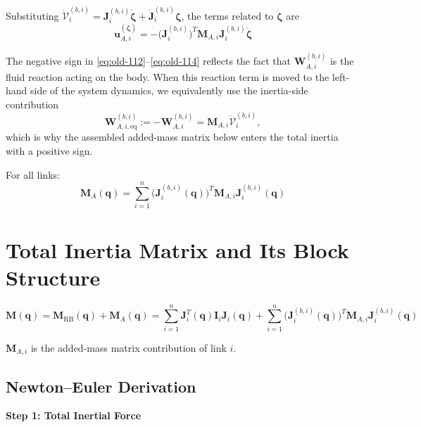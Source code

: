 \documentclass[12pt,a4paper]{report}
\newcommand{\newsymbols}[1]{\par\noindent{}#1\par\vspace{0.35em}}
\begin{document}
Substituting $\dot{\mathcal{V}}_i^{(b,i)} = \mathbf{J}_i^{(b,i)} \dot{\boldsymbol{\zeta}} + \dot{\mathbf{J}}_i^{(b,i)} \boldsymbol{\zeta}$, the terms related to $\dot{\boldsymbol{\zeta}}$ are
\begin{equation}
\mathbf{u}_{A,i}^{(\dot{\boldsymbol{\zeta}})} = -\bigl(\mathbf{J}_i^{(b,i)}\bigr)^T \mathbf{M}_{A,i} \mathbf{J}_i^{(b,i)} \dot{\boldsymbol{\zeta}}
\label{eq:old-114}
\end{equation}

The negative sign in \eqref{eq:old-112}--\eqref{eq:old-114} reflects the fact that $\mathbf{W}_{A,i}^{(b,i)}$ is the fluid reaction acting on the body. When this reaction term is moved to the left-hand side of the system dynamics, we equivalently use the inertia-side contribution
\begin{equation}
\mathbf{W}_{A,i,\mathrm{eq}}^{(b,i)}
:=
-\mathbf{W}_{A,i}^{(b,i)}
=
\mathbf{M}_{A,i}\dot{\mathcal{V}}_i^{(b,i)},
\end{equation}
which is why the assembled added-mass matrix below enters the total inertia with a positive sign.

For all links:
\begin{equation}
\boxed{\mathbf{M}_A(\mathbf{q}) = \sum_{i=1}^{n} \bigl(\mathbf{J}_i^{(b,i)}(\mathbf{q})\bigr)^T \mathbf{M}_{A,i} \mathbf{J}_i^{(b,i)}(\mathbf{q})}
\label{eq:old-115}
\end{equation}

\section{Total Inertia Matrix and Its Block Structure}

\begin{equation}
\mathbf{M}(\mathbf{q}) = \mathbf{M}_{\text{RB}}(\mathbf{q}) + \mathbf{M}_A(\mathbf{q})
=
\sum_{i=1}^{n} \mathbf{J}_i^T(\mathbf{q}) \mathbf{I}_i \mathbf{J}_i(\mathbf{q})
+
\sum_{i=1}^{n} \bigl(\mathbf{J}_i^{(b,i)}(\mathbf{q})\bigr)^T \mathbf{M}_{A,i} \mathbf{J}_i^{(b,i)}(\mathbf{q})
\label{eq:old-116}
\end{equation}
\newsymbols{$\mathbf{M}_{A,i}$ is the added-mass matrix contribution of link $i$.}

\subsection{Newton--Euler Derivation}

\textbf{Step 1: Total Inertial Force}
\end{document}
